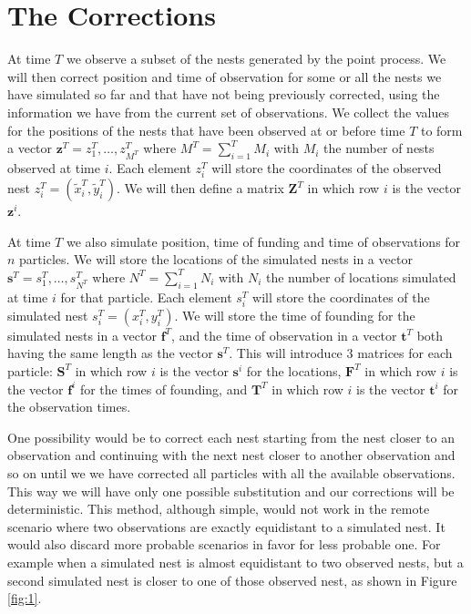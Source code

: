 \documentclass[11pt,a4paper]{article}
\renewcommand{\vec}[1]{\mathbf{#1}}
\begin{document}
{\section{The Corrections}

At time $T$ we observe a subset of the nests generated by the point process. We will then correct position and time of observation for some or all the nests we have simulated so far and that have not being previously corrected, using the information we have from the current set of observations. We collect the values for the positions of the nests that have been observed at or before time $T$ to form a vector $\vec{z}^T = z^T_1, \dots, z^T_{M^T}$ where $M^T = \sum_{i = 1}^T M_i$ with $M_i$ the number of nests observed at time $i$. Each element $z^T_i$ will store the coordinates of the observed nest $z^T_i = {(\tilde{x}^T_i, \tilde{y}^T_i)}$.  We will then define a matrix $\vec{Z}^T$ in which row $i$ is the vector $\vec{z}^i$.

At time $T$ we also simulate position, time of funding and time of observations for $n$ particles. We will store the locations of the simulated nests in a vector $\vec{s}^T = s^T_1, \dots, s^T_{N^T}$ where $N^T = \sum_{i = 1}^T N_i$ with $N_i$ the number of locations simulated at time $i$ for that particle. Each element $s^T_i$ will store the coordinates of the simulated nest $s^T_i = {(x^T_i, y^T_i)}$. We will store the time of founding for the simulated nests in a vector $\vec{f}^T$, and the time of observation in a vector $\vec{t}^T$ both having the same length as the vector $\vec{s}^T$. This will introduce 3 matrices for each particle: $\vec{S}^T$ in which row $i$ is the vector $\vec{s}^i$ for the locations, $\vec{F}^T$ in which row $i$ is the vector $\vec{f}^i$ for the times of founding, and $\vec{T}^T$ in which row $i$ is the vector $\vec{t}^i$ for the observation times.

One possibility would be to correct each nest starting from the nest closer to an observation and continuing with the next nest closer to another observation and so on until we we have corrected all particles with all the available observations. This way we will have only one possible substitution and our corrections will be deterministic. This method, although simple, would not work in the remote scenario where two observations are exactly equidistant to a simulated nest. It would also discard more probable scenarios in favor for less probable one. For example when a simulated nest is almost equidistant to two observed nests, but a second simulated nest is closer to one of those observed nest, as shown in Figure \ref{fig:1}.


}
\end{document}
